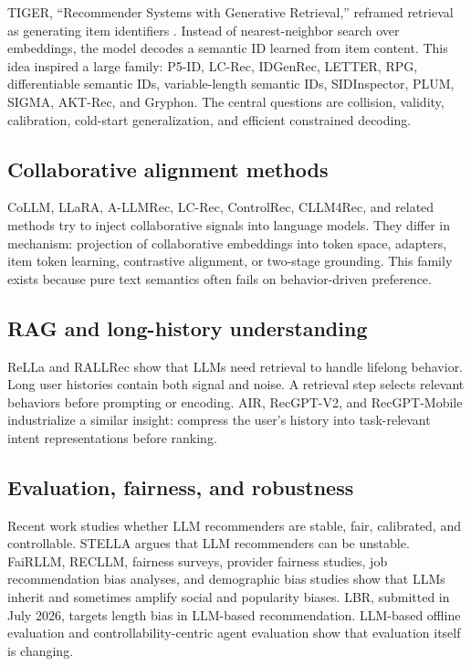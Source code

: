 \documentclass[11pt]{article}
\begin{document}
TIGER, ``Recommender Systems with Generative Retrieval,'' reframed retrieval as generating item identifiers \cite{tiger}. Instead of nearest-neighbor search over embeddings, the model decodes a semantic ID learned from item content. This idea inspired a large family: P5-ID, LC-Rec, IDGenRec, LETTER, RPG, differentiable semantic IDs, variable-length semantic IDs, SIDInspector, PLUM, SIGMA, AKT-Rec, and Gryphon. The central questions are collision, validity, calibration, cold-start generalization, and efficient constrained decoding.

\subsection{Collaborative alignment methods}

CoLLM, LLaRA, A-LLMRec, LC-Rec, ControlRec, CLLM4Rec, and related methods try to inject collaborative signals into language models. They differ in mechanism: projection of collaborative embeddings into token space, adapters, item token learning, contrastive alignment, or two-stage grounding. This family exists because pure text semantics often fails on behavior-driven preference.

\subsection{RAG and long-history understanding}

ReLLa and RALLRec show that LLMs need retrieval to handle lifelong behavior. Long user histories contain both signal and noise. A retrieval step selects relevant behaviors before prompting or encoding. AIR, RecGPT-V2, and RecGPT-Mobile industrialize a similar insight: compress the user's history into task-relevant intent representations before ranking.

\subsection{Evaluation, fairness, and robustness}

Recent work studies whether LLM recommenders are stable, fair, calibrated, and controllable. STELLA argues that LLM recommenders can be unstable. FaiRLLM, RECLLM, fairness surveys, provider fairness studies, job recommendation bias analyses, and demographic bias studies show that LLMs inherit and sometimes amplify social and popularity biases. LBR, submitted in July 2026, targets length bias in LLM-based recommendation. LLM-based offline evaluation and controllability-centric agent evaluation show that evaluation itself is changing.
\end{document}
